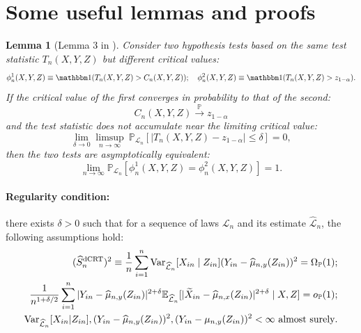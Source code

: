 \documentclass[12pt]{article}
\newtheorem{lemma}{Lemma}
\theoremstyle{definition}
\def\P{\mathbb{P}}
\def\P{\mathbb{P}}
\newcommand{\E}{\mathbb E}								%
\newcommand{\V}{\mathrm{Var}}							%
\renewcommand{\P}{\mathbb{P}}							%
\newcommand{\indicator}{\mathbbm 1}						%
\newcommand{\convp}{\overset{\mathbb{P}}{\rightarrow}}             %
\newcommand{\srx}{X}									%
\newcommand{\srz}{Z}									%
\newcommand{\srxk}{\widetilde X}						%
\newcommand{\sry}{Y}									%
\newcommand{\law}{\mathcal L}							%
\newcommand{\lawhat}{\widehat{\mathcal L}}				%
\newcommand{\dCRT}{\textnormal{dCRT}} 					%
\begin{document}
\section{Some useful lemmas and proofs}\label{sec:useful_lemma}


\begin{lemma}[Lemma 3 in \cite{Niu2022a}]\label{lem:unified_asymptotic_equivalence}
	Consider two hypothesis tests based on the same test statistic $T_n(\srx, \sry, \srz)$ but different critical values:
	\begin{equation*}
		\phi_n^1(\srx, \sry, \srz) \equiv \indicator(T_n(\srx, \sry, \srz) > C_n(\srx, \sry, \srz)); \quad \phi_n^2(\srx, \sry, \srz) \equiv \indicator(T_n(\srx, \sry, \srz) > z_{1-\alpha}). 
	\end{equation*}
	If the critical value of the first converges in probability to that of the second:
	\begin{equation*}
		C_n(\srx, \sry, \srz) \convp z_{1-\alpha}
	\end{equation*}
	and the test statistic does not accumulate near the limiting critical value:
	\begin{equation}
		\lim_{\delta \rightarrow 0}\limsup_{n \rightarrow \infty}\ \P_{\law_n}[|T_n(\srx, \sry, \srz)-z_{1-\alpha}| \leq \delta] = 0,
		\label{eq:non-accumulation-app}
	\end{equation}
	then the two tests are asymptotically equivalent:
	\begin{equation*}
		\lim_{n \rightarrow \infty}\P_{\law_n}[\phi_n^{1}(\srx, \sry, \srz) = \phi_n^2(\srx, \sry, \srz)] = 1.
	\end{equation*}
\end{lemma}


\paragraph{\textbf{Regularity condition:}}
there exists $\delta>0$ such that for a sequence of laws $\law_n$ and its estimate $\lawhat_n$, the following assumptions hold:
\begin{align}
    (\widehat{S}_n^{\dCRT})^2\equiv\frac{1}{n}\sum_{i=1}^n\V_{\lawhat_n}[\srx_{in}\mid \srz_{in}](\sry_{in}-\widehat{\mu}_{n,y}(\srz_{in}))^2=\Omega_\P(1) \label{eq:variance_lower_bound};\\
    \frac{1}{n^{1+\delta/2}} \sum_{i=1}^n |\sry_{in}-\widehat \mu_{n,y}(\srz_{in})|^{2+\delta}\E_{\lawhat_n}[|\srxk_{in}-\widehat\mu_{n,x}(\srz_{in})|^{2+\delta}\mid \srx,\srz] =o_\P(1)\label{eq:Lyapunov_condition_2};\\
    \V_{\lawhat_n}[\srx_{in}|\srz_{in}],(\sry_{in}-\widehat{\mu}_{n,y}(\srz_{in}))^2,(\sry_{in}-\mu_{n,y}(\srz_{in}))^2<\infty\ \text{almost surely}\label{eq:non_degeneracy}.
\end{align}
\end{document}
